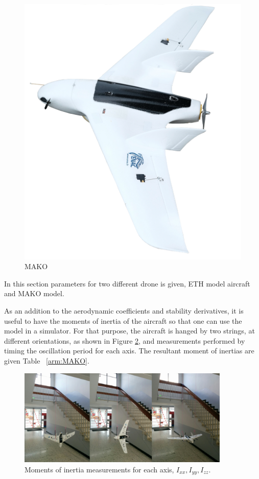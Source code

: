 \begin{figure}
\centering
\includegraphics[width=0.7\columnwidth]{figures/makoEmptyBack}
\caption{MAKO}
\label{figure:mako}
\end{figure}


In this section parameters for two different drone is given, ETH model aircraft and MAKO model. 

As an addition to the aerodynamic coefficients and stability derivatives, it is useful to have the moments of inertia of the aircraft so that one can use the model in a simulator. 
For that purpose, the aircraft is hanged by two strings, at different orientations, as shown in Figure \ref{fig:inertia}, and measurements performed by timing the oscillation period for each axis. 
The resultant moment of inertias are given Table ~\ref{arm:MAKO}. 


 \begin{figure}[!ht]
      \centering
      \includegraphics[width=0.9\textwidth]{figures/Mako_Inertia_combined_small.png}
      \caption{Moments of inertia measurements for each axis, $I_{xx} , I_{yy} , I_{zz} $.}
      \label{fig:inertia}
 \end{figure}
 
